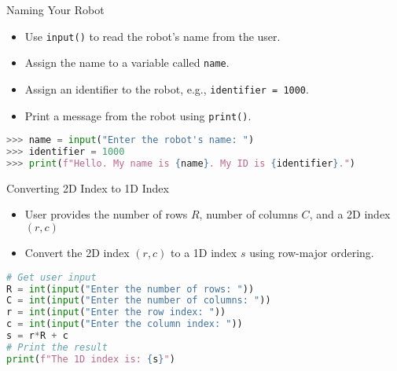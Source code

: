 \begin{frame}[fragile]{Naming Your Robot}
    \begin{itemize}
        \item Use \texttt{input()} to read the robot's name from the user.
        \item Assign the name to a variable called \texttt{name}.
        \item Assign an identifier to the robot, e.g., \texttt{identifier = 1000}.
        \item Print a message from the robot using \texttt{print()}.
    \end{itemize}
    \begin{lstlisting}[style=colorful, language=Python]
>>> name = input("Enter the robot's name: ")
>>> identifier = 1000
>>> print(f"Hello. My name is {name}. My ID is {identifier}.")
    \end{lstlisting}
\end{frame}

\begin{frame}[fragile]{Converting 2D Index to 1D Index}
    \begin{itemize}
        \item User provides the number of rows \(R\), number of columns \(C\), and a 2D index \((r, c)\)
        \item Convert the 2D index \((r, c)\) to a 1D index \(s\) using row-major ordering.
    \end{itemize}
    \begin{lstlisting}[style=colorful, language=Python]
# Get user input
R = int(input("Enter the number of rows: "))
C = int(input("Enter the number of columns: "))
r = int(input("Enter the row index: "))
c = int(input("Enter the column index: "))
s = r*R + c
# Print the result
print(f"The 1D index is: {s}")
    \end{lstlisting}
\end{frame}